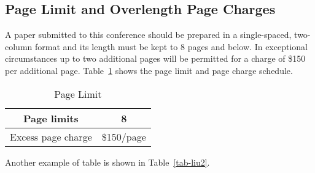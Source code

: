 \def\del{
\subsection{What Sections to Include}
Usually, your paper should have Introduction, Main Results, Simulation Results, and
Conclusions. You may also add Acknowledgments if you like.
After that, you should have your References.}

\subsection{Page Limit and Overlength Page Charges}

A paper submitted to this conference should be prepared in a single-spaced, two-column 
format and its length must be kept to 8 pages and below.
In exceptional circumstances up to two additional pages will be
permitted for a charge of \$150 per additional page.
Table~\ref{table_example} shows the page limit
and page charge schedule.

%
\begin{table}
\begin{center}
\renewcommand{\arraystretch}{1.3}
\caption{Page Limit}
\label{table_example}
\begin{tabular}{|c|c|}
\hline
Page limits & 8\\
\hline
Excess page charge & \$150/page\\
\hline
\end{tabular}
\end{center}
\end{table}

Another example of table is shown in Table~\ref{tab-liu2}.

